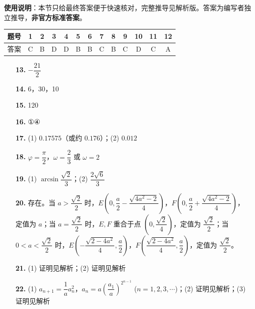
\begin{gknotice}
\textbf{使用说明}：本节只给最终答案便于快速核对，完整推导见解析版。答案为编写者独立推导，\textbf{非官方标准答案}。
\end{gknotice}

\begin{center}\begin{tabular}{ccccccccccccc}
\toprule
题号 & 1 & 2 & 3 & 4 & 5 & 6 & 7 & 8 & 9 & 10 & 11 & 12 \\
\midrule
答案 & C & B & D & D & B & B & C & B & C & D & C & A \\
\bottomrule
\end{tabular}\end{center}

\begin{itemize}[leftmargin=2.6em]
  \item[\textbf{13.}] $-\dfrac{21}{2}$
  \item[\textbf{14.}] 6，30，10
  \item[\textbf{15.}] 120
  \item[\textbf{16.}] ①④
\end{itemize}

\begin{itemize}[leftmargin=2.6em]
  \item[\textbf{17.}] (1) $0.17575$（或约 $0.176$）；(2) $0.012$
  \item[\textbf{18.}] $\varphi = \dfrac{\pi}{2}$，$\omega = \dfrac{2}{3}$ 或 $\omega = 2$
  \item[\textbf{19.}] (1) $\arcsin\dfrac{\sqrt{2}}{3}$；(2) $\dfrac{2\sqrt{6}}{3}$
  \item[\textbf{20.}] 存在。当 $a > \dfrac{\sqrt{2}}{2}$ 时，$E\left(0, \dfrac{a}{2} - \dfrac{\sqrt{4a^2 - 2}}{4}\right)$，$F\left(0, \dfrac{a}{2} + \dfrac{\sqrt{4a^2 - 2}}{4}\right)$，定值为 $a$；当 $a = \dfrac{\sqrt{2}}{2}$ 时，$E, F$ 重合于点 $\left(0, \dfrac{\sqrt{2}}{4}\right)$，定值为 $\dfrac{\sqrt{2}}{2}$；当 $0 < a < \dfrac{\sqrt{2}}{2}$ 时，$E\left(-\dfrac{\sqrt{2 - 4a^2}}{4}, \dfrac{a}{2}\right)$，$F\left(\dfrac{\sqrt{2 - 4a^2}}{4}, \dfrac{a}{2}\right)$，定值为 $\dfrac{\sqrt{2}}{2}$。
  \item[\textbf{21.}] (1) 证明见解析；(2) 证明见解析
  \item[\textbf{22.}] (1) $a_{n+1} = \dfrac{1}{a} a_n^2$，$a_n = a\left(\dfrac{a_1}{a}\right)^{2^{n-1}}$ ($n = 1, 2, 3, \cdots$)；(2) 证明见解析；(3) 证明见解析
\end{itemize}
